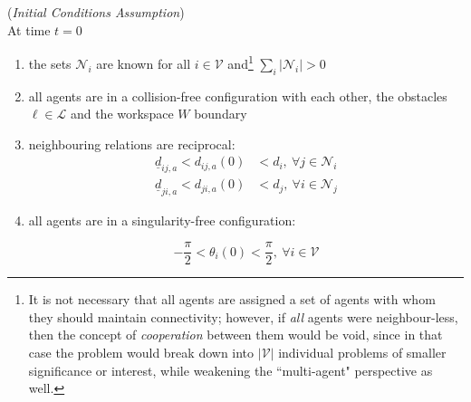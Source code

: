 \begin{gg_box}
\begin{assumption}(\textit{Initial Conditions Assumption})\\

  At time $t = 0$

  \begin{enumerate}

    \item the sets $\mathcal{N}_i$ are known for all $i \in \mathcal{V}$
      and\footnote{It is not necessary that
      all agents are assigned a set of agents with whom they should maintain
      connectivity; however, if \textit{all} agents were neighbour-less,
      then the concept of \textit{cooperation} between them would be void,
      since in that case the problem would break down into $|\mathcal{V}|$
      individual problems of smaller significance or interest, while
      weakening the ``multi-agent" perspective as well.}
      $\sum\limits_i |\mathcal{N}_i| > 0$

    \item all agents are in a collision-free configuration with each other,
      the obstacles $\ell \in \mathcal{L}$ and the workspace $W$ boundary

    \item neighbouring relations are reciprocal:
      \begin{align}
        \underline{d}_{ij,a} < d_{ij,a}(0) &< d_i,\ \forall j \in \mathcal{N}_i \\
        \underline{d}_{ji,a} < d_{ji,a}(0) &< d_j,\ \forall i \in \mathcal{N}_j
      \end{align}

    \item all agents are in a singularity-free configuration:

      $$ -\frac{\pi}{2} < \theta_i(0) < \frac{\pi}{2},\ \forall i \in \mathcal{V}$$

  \end{enumerate}
  \label{ass:initial_conditions}
\end{assumption}
\end{gg_box}



